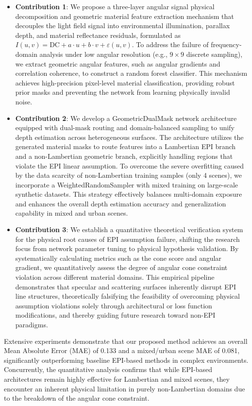 \documentclass[lettersize,journal]{IEEEtran}
\begin{document}
\begin{itemize}
\item \textbf{Contribution 1}: We propose a three-layer angular signal physical decomposition and geometric material feature extraction mechanism that decouples the light field signal into environmental illumination, parallax depth, and material reflectance residuals, formulated as $I(u,v) = \text{DC} + a \cdot u + b \cdot v + \varepsilon(u,v)$. To address the failure of frequency-domain analysis under low angular resolution (e.g., $9 \times 9$ discrete sampling), we extract geometric angular features, such as angular gradients and correlation coherence, to construct a random forest classifier. This mechanism achieves high-precision pixel-level material classification, providing robust prior masks and preventing the network from learning physically invalid noise.
\item \textbf{Contribution 2}: We develop a GeometricDualMask network architecture equipped with dual-mask routing and domain-balanced sampling to unify depth estimation across heterogeneous surfaces. The architecture utilizes the generated material masks to route features into a Lambertian EPI branch and a non-Lambertian geometric branch, explicitly handling regions that violate the EPI linear assumption. To overcome the severe overfitting caused by the data scarcity of non-Lambertian training samples (only 4 scenes), we incorporate a WeightedRandomSampler with mixed training on large-scale synthetic datasets. This strategy effectively balances multi-domain exposure and enhances the overall depth estimation accuracy and generalization capability in mixed and urban scenes.
\item \textbf{Contribution 3}: We establish a quantitative theoretical verification system for the physical root causes of EPI assumption failure, shifting the research focus from network parameter tuning to physical hypothesis validation. By systematically calculating metrics such as the cone score and angular gradient, we quantitatively assess the degree of angular cone constraint violation across different material domains. This empirical pipeline demonstrates that specular and scattering surfaces inherently disrupt EPI line structures, theoretically falsifying the feasibility of overcoming physical assumption violations solely through architectural or loss function modifications, and thereby guiding future research toward non-EPI paradigms.
\end{itemize}

Extensive experiments demonstrate that our proposed method achieves an overall Mean Absolute Error (MAE) of 0.133 and a mixed/urban scene MAE of 0.081, significantly outperforming baseline EPI-based methods in complex environments. Concurrently, the quantitative analysis confirms that while EPI-based architectures remain highly effective for Lambertian and mixed scenes, they encounter an inherent physical limitation in purely non-Lambertian domains due to the breakdown of the angular cone constraint.
\end{document}
